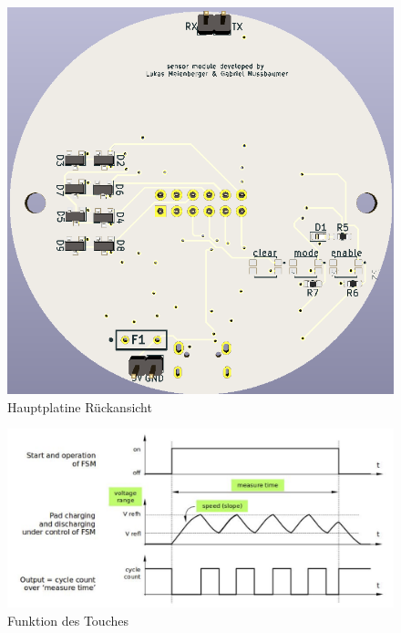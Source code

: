 \begin{figure}[h!]
\begin{minipage}[t]{0.4\linewidth}
		\includegraphics[width=1\textwidth]{graphics/Hauptplatine_hinten.png}
		\caption{Hauptplatine Rückansicht}
		\label{pic: Hauptplatine_hinten}
	\end{minipage}
\end{figure}

\begin{figure}[h!]
	\centering
	\includegraphics[width=1\textwidth]{graphics/touch_funktion.png}
	\caption{Funktion des Touches \cite{noauthor_touch_nodate}}
	\label{pic: touch_funktion}
\end{figure}

